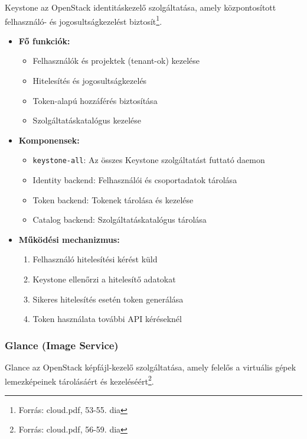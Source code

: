\documentclass[a4paper,12pt]{article}
\begin{document}
    Keystone az OpenStack identitáskezelő szolgáltatása, amely központosított felhasználó- és jogosultságkezelést biztosít\footnote{Forrás: cloud.pdf, 53-55. dia}.

    \begin{itemize}
        \item \textbf{Fő funkciók:}
        \begin{itemize}
            \item Felhasználók és projektek (tenant-ok) kezelése
            \item Hitelesítés és jogosultságkezelés
            \item Token-alapú hozzáférés biztosítása
            \item Szolgáltatáskatalógus kezelése
        \end{itemize}

        \item \textbf{Komponensek:}
        \begin{itemize}
            \item \texttt{keystone-all}: Az összes Keystone szolgáltatást futtató daemon
            \item Identity backend: Felhasználói és csoportadatok tárolása
            \item Token backend: Tokenek tárolása és kezelése
            \item Catalog backend: Szolgáltatáskatalógus tárolása
        \end{itemize}

        \item \textbf{Működési mechanizmus:}
        \begin{enumerate}
            \item Felhasználó hitelesítési kérést küld
            \item Keystone ellenőrzi a hitelesítő adatokat
            \item Sikeres hitelesítés esetén token generálása
            \item Token használata további API kéréseknél
        \end{enumerate}
    \end{itemize}

    \subsubsection{Glance (Image Service)}

    Glance az OpenStack képfájl-kezelő szolgáltatása, amely felelős a virtuális gépek lemezképeinek tárolásáért és kezeléséért\footnote{Forrás: cloud.pdf, 56-59. dia}.
\end{document}

